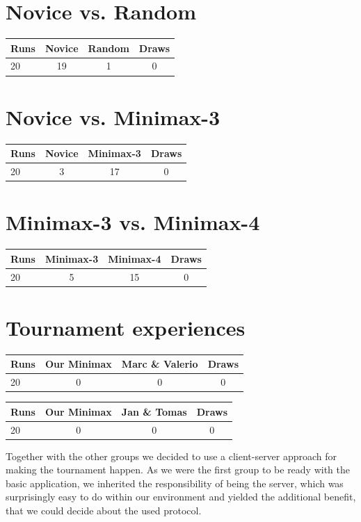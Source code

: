 \documentclass{scrartcl}
\begin{document}
\section{Novice vs. Random}

\begin{tabular}{l c c c}
Runs & Novice & Random & Draws \\
\hline
20 & 19 & 1 & 0  \\
\end{tabular}

\section{Novice vs. Minimax-3}

\begin{tabular}{l c c c}
Runs & Novice & Minimax-3 & Draws \\
\hline
20 & 3 & 17 & 0  \\
\end{tabular}

\section{Minimax-3 vs. Minimax-4}

\begin{tabular}{l c c c}
Runs & Minimax-3 & Minimax-4 & Draws \\
\hline
20 & 5 & 15 & 0  \\
\end{tabular}

\section{Tournament experiences}

\begin{tabular}{l c c c}
Runs & Our Minimax & Marc \& Valerio & Draws \\
\hline
20 & 0 & 0 & 0  \\
\end{tabular}

\begin{tabular}{l c c c}
Runs & Our Minimax & Jan \& Tomas & Draws \\
\hline
20 & 0 & 0 & 0  \\
\end{tabular}

Together with the other groups we decided to use a client-server approach for making the tournament happen. As we were the first group to be ready with the basic application, we inherited the responsibility of being the server, which was surprisingly easy to do within our environment and yielded the additional benefit, that we could decide about the used protocol.
\end{document}
